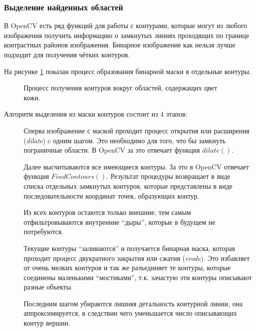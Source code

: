 \documentclass[12pt]{report}
\begin{document}
\subsubsection{Выделение найденных областей}
В OpenCV есть ряд функций для работы с контурами, которые могут из любого изображения получить информацию о замкнутых 
линиях проходящих по границе контрастных районов изображения. Бинарное изображение как нельзя лучше подходит для 
получения чётких контуров.

На рисунке \ref{fig:countour_process} показан процесс образования бинарной маски в отдельные контуры.

\begin{figure}[h]
	\centering
	\caption{Процесс получения контуров вокруг областей, содержащих цвет кожи.}
	\label{fig:countour_process}
\end{figure}


Алгоритм выделения из маски контуров состоит из 4 этапов:
\begin{description}
\item[] Сперва изображение с маской проходит процесс открытия или расширения (\textit{dilate}) c 
одним шагом. Это 
необходимо для того, что бы замкнуть пограничные области. В OpenCV за это отвечает функция 
$dilate()$.
\item[] Далее высчитываются все имеющиеся контуры. За это в OpenCV отвечает функция $FindContours
()$. Результат 
процедуры возвращает в виде списка отдельных замкнутых контуров, которые представлены в виде последовательности 
координат точек, образующих контур.
\item[] Из всех контуров остаются только внешние, тем самым отфильтровываются внутренние ``дыры'', 
которые в 
будущем не потребуются.
\item[] Текущие контуры ``заливаются'' и получается бинарная маска, которая проходит процесс 
двукратного закрытия 
или сжатия (\textit{erode}). Это избавляет от очень мелких контуров и так же разъединяет те контуры, которые 
соединены маленькими ``мостиками'', т.к. зачастую эти контуры описывают разные объекты.
\item[] Последним шагом убираются лишняя детальность контурной линии, она аппроксимируется, в 
следствии чего 
уменьшается число описывающих контур вершин.
\end{description}
\end{document}
